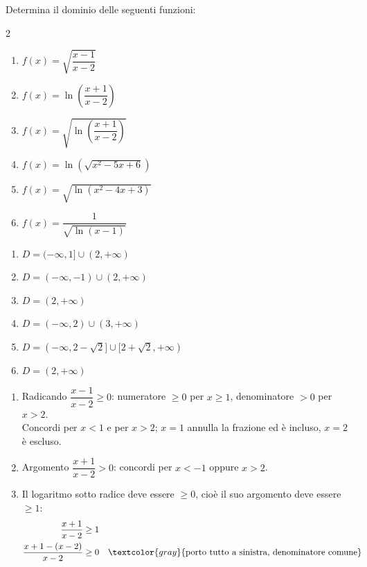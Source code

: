 \begin{question}[ID=1.4, subtitle={Dominio di funzioni con condizioni multiple}, difficulty=difficile, tags={funzioni, dominio}]
Determina il dominio delle seguenti funzioni:
\begin{multicols}{2}
\begin{enumerate}[leftmargin=3.2cm]
    \item $f(x)=\sqrt{\dfrac{x-1}{x-2}}$
    \item $f(x)=\ln\left(\dfrac{x+1}{x-2}\right)$
    \item $f(x)=\sqrt{\ln\left(\dfrac{x+1}{x-2}\right)}$
    \item $f(x)=\ln\left(\sqrt{x^2-5x+6}\right)$
    \item $f(x)=\sqrt{\ln(x^2-4x+3)}$
    \item $f(x)=\dfrac{1}{\sqrt{\ln(x-1)}}$
\end{enumerate}
\end{multicols}
\begin{solution}
\begin{enumerate}
    \item $D=(-\infty,1]\cup(2,+\infty)$
    \item $D=(-\infty,-1)\cup(2,+\infty)$
    \item $D=(2,+\infty)$
    \item $D=(-\infty,2)\cup(3,+\infty)$
    \item $D=(-\infty,2-\sqrt2]\cup[2+\sqrt2,+\infty)$
    \item $D=(2,+\infty)$
\end{enumerate}
\end{solution}
\begin{explanation}
\begin{enumerate}
    \item Radicando $\dfrac{x-1}{x-2}\geq 0$: numeratore $\geq0$ per $x\geq1$, denominatore $>0$ per $x>2$. \\
    Concordi per $x<1$ e per $x>2$; $x=1$ annulla la frazione ed è incluso, $x=2$ è escluso.
    \item Argomento $\dfrac{x+1}{x-2}>0$: concordi per $x<-1$ oppure $x>2$.
    \item Il logaritmo sotto radice deve essere $\geq 0$, cioè il suo argomento deve essere $\geq 1$:
    \[\begin{aligned}
    \dfrac{x+1}{x-2} &\geq 1\\
    \dfrac{x+1-(x-2)}{x-2} &\geq 0 && \textcolor{gray}{\text{porto tutto a sinistra, denominatore comune}}\\

\end{aligned}\]
\end{enumerate}
\end{explanation}
\end{question}
